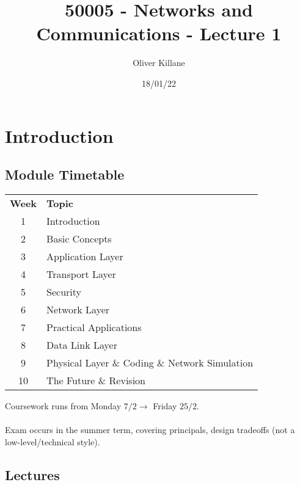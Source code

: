 \documentclass{report}
\title{50005 - Networks and Communications - Lecture 1}
\author{Oliver Killane}
\date{18/01/22}
\begin{document}
    \maketitle

    \section*{Introduction}
        \subsection*{Module Timetable}
            \begin{center}
                \begin{tabular}{c l}
                    \textbf{Week} & \textbf{Topic} \\
                    1 & Introduction \\
                    2 & Basic Concepts \\
                    3 & Application Layer \\
                    4 & Transport Layer \\
                    5 & Security \\
                    6 & Network Layer \\
                    7 & Practical Applications \\
                    8 & Data Link Layer \\
                    9 & Physical Layer \& Coding \& Network Simulation \\
                    10 & The Future \& Revision \\
                \end{tabular}
            \end{center}
            Coursework runs from Monday $7/2 \to$ Friday $25/2$.
            \\
            \\ Exam occurs in the summer term, covering principals, design tradeoffs (not a low-level/technical style).


        \subsection*{Lectures}
        
\end{document}
